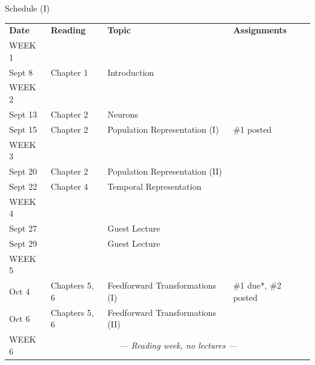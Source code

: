 \documentclass[aspectratio=169]{beamer}
\begin{document}
\begin{frame}{Schedule (I)}
\small
\begin{tabular}{p{2cm} p{2cm} p{5cm} p{3cm}}
	\toprule
	\textbf{Date} &	\textbf{Reading} &	\textbf{Topic} & \textbf{Assignments} \\
	\tiny WEEK 1 & & & \\
	Sept 8 &
	Chapter 1 &
	Introduction &
	\\[0.05cm]
	\tiny WEEK 2 & & & \\
	Sept 13 &
	Chapter 2 &
	Neurons &
	\\
	Sept 15 &
	Chapter 2 &
	Population Representation (I) &
	\#1 posted
	\\[0.05cm]
	\tiny WEEK 3 & & & \\
	Sept 20 &
	Chapter 2 &
	Population Representation (II) &
	\\
	Sept 22 &
	Chapter 4 &
	Temporal Representation &
	\\[0.05cm]
	\tiny WEEK 4 & & & \\
	Sept 27 &
	 &
	Guest Lecture &
	\\
	Sept 29 & & Guest Lecture &
	\\[0.05cm]
	\tiny WEEK 5 & & & \\
	
	Oct 4 &
	Chapters 5, 6 &
	Feedforward Transformations (I) &
	\#1 due*, \#2 posted\\
	Oct 6 &
	Chapters 5, 6 &
	Feedforward Transformations (II) &
	\\[0.05cm]
	\tiny WEEK 6 & \multicolumn{3}{c}{\emph{--- Reading week, no lectures ---}} \\[0.05cm]
	
	\bottomrule
\end{tabular}
\end{frame}
\end{document}
